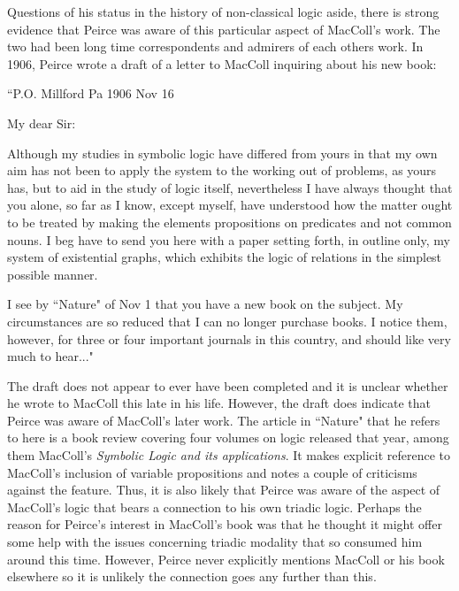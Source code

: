 \documentclass[12pt]{article}
\begin{document}
Questions of his status in the history of non-classical logic aside, there is strong evidence that Peirce was aware of this particular aspect of MacColl's work. The two had been long time correspondents and admirers of each others work. In 1906, Peirce wrote a draft of a letter to MacColl inquiring about his new book:
\begin{singlespace}
``P.O. Millford Pa 1906 Nov 16

My dear Sir:

Although my studies in symbolic logic have differed from yours in that my own aim has not been to apply the system to the working out of problems, as yours has, but to aid in the study of logic itself, nevertheless I have always thought that you alone, so far as I know, except myself, have understood how the matter ought to be treated by making the elements propositions on predicates and not common nouns. I beg have to send you here with a paper setting forth, in outline only, my system of existential graphs, which exhibits the logic of relations in the simplest possible manner.

I see by ``Nature" of Nov 1 that you have a new book on the subject. My circumstances are so reduced that I can no longer purchase books. I notice them, however, for three or four important journals in this country, and should like very much to hear..."
\end{singlespace}
\noindent The draft does not appear to ever have been completed and it is unclear whether he wrote to MacColl this late in his life. However, the draft does indicate that Peirce was aware of MacColl's later work. The article in ``Nature" that he refers to here is a book review covering four volumes on logic released that year, among them MacColl's \textit{Symbolic Logic and its applications}. It makes explicit reference to MacColl's inclusion of variable propositions and notes a couple of criticisms against the feature. Thus, it is also likely that Peirce was aware of the aspect of MacColl's logic that bears a connection to his own triadic logic. Perhaps the reason for Peirce's interest in MacColl's book was that he thought it might offer some help with the issues concerning triadic modality that so consumed him around this time. However, Peirce never explicitly mentions MacColl or his book elsewhere so it is unlikely the connection goes any further than this.
\end{document}
